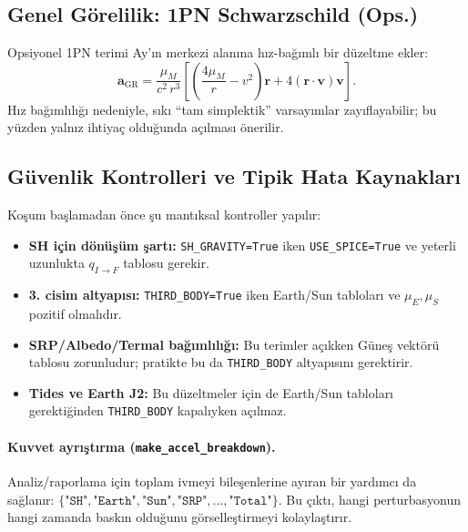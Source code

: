 \subsection*{Genel Görelilik: 1PN Schwarzschild (Ops.)}
Opsiyonel 1PN terimi Ay’ın merkezi alanına hız-bağımlı bir düzeltme ekler:
\begin{equation}
\mathbf{a}_\text{GR} = \frac{\mu_M}{c^2\,r^3}
\left[
\left(\frac{4\mu_M}{r}-v^2\right)\mathbf{r} + 4(\mathbf{r}\cdot\mathbf{v})\mathbf{v}
\right].
\end{equation}
Hız bağımlılığı nedeniyle, sıkı ``tam simplektik'' varsayımlar zayıflayabilir; bu yüzden yalnız ihtiyaç olduğunda açılması önerilir.

\subsection*{Güvenlik Kontrolleri ve Tipik Hata Kaynakları}
Koşum başlamadan önce şu mantıksal kontroller yapılır:
\begin{itemize}
  \item \textbf{SH için dönüşüm şartı:} \texttt{SH\_GRAVITY=True} iken \texttt{USE\_SPICE=True} ve yeterli uzunlukta \(q_{I\rightarrow F}\) tablosu gerekir.
  \item \textbf{3. cisim altyapısı:} \texttt{THIRD\_BODY=True} iken Earth/Sun tabloları ve \(\mu_E,\mu_S\) pozitif olmalıdır.
  \item \textbf{SRP/Albedo/Termal bağımlılığı:} Bu terimler açıkken Güneş vektörü tablosu zorunludur; pratikte bu da \texttt{THIRD\_BODY} altyapısını gerektirir.
  \item \textbf{Tides ve Earth J2:} Bu düzeltmeler için de Earth/Sun tabloları gerektiğinden \texttt{THIRD\_BODY} kapalıyken açılmaz.
\end{itemize}

\paragraph{Kuvvet ayrıştırma (\texttt{make\_accel\_breakdown}).}
Analiz/raporlama için toplam ivmeyi bileşenlerine ayıran bir yardımcı da sağlanır:
\(\{\texttt{"SH"},\texttt{"Earth"},\texttt{"Sun"},\texttt{"SRP"},\ldots,\texttt{"Total"}\}\).
Bu çıktı, hangi perturbasyonun hangi zamanda baskın olduğunu görselleştirmeyi kolaylaştırır.

